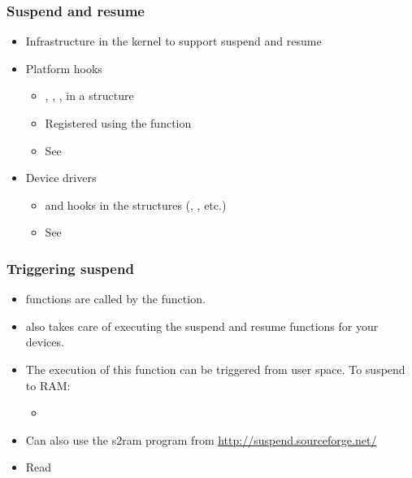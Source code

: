 \begin{frame}
  \frametitle{Suspend and resume}
  \begin{itemize}
  \item Infrastructure in the kernel to support suspend and resume
  \item Platform hooks
    \begin{itemize}
    \item {}, , ,
       in a  structure
    \item Registered using the  function
    \item See 
    \end{itemize}
  \item Device drivers
    \begin{itemize}
    \item {} and  hooks in the
       structures (,
      , etc.)
    \item See 
    \end{itemize}
  \end{itemize}
\end{frame}

\begin{frame}
  \frametitle{Triggering suspend}
  \begin{itemize}
  \item {} functions are called by the
     function.
  \item {} also takes care of executing the suspend
    and resume functions for your devices.
  \item The execution of this function can be triggered from
    user space. To suspend to RAM:
    \begin{itemize}
    \item {}
    \end{itemize}
  \item Can also use the s2ram program from
    \url{http://suspend.sourceforge.net/}
  \item Read 
  \end{itemize}
\end{frame}

